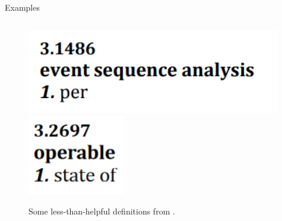 \documentclass[22pt]{beamer}
\begin{document}
\begin{frame}[fragile]
\begin{textblock}{7.25}
\begin{block}{\fontsize{37}{20}\selectfont Examples}
\begin{columns}
\begin{column}{0.4\textwidth}
\begin{center}
\begin{figure}
                            \vspace{2mm}

                            \includegraphics[height=3.7cm]{per.png}
                            \includegraphics[height=3.5cm]{state of.png}
                            \label{Fig:unhelpful-defs}
                            \caption{Some less-than-helpful definitions from \cite{IEEE2017}.}
                        \end{figure}
                    \end{center}
                \end{column}
            \end{columns}

            \vspace{-5mm}
        \end{block}


\end{textblock}
\end{frame}
\end{document}
